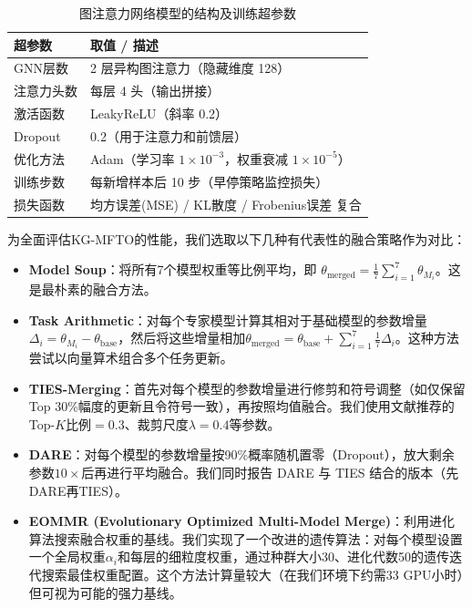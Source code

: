 \documentclass[../main.tex]{subfiles}
\begin{document}
\begin{table}[tb]
	\centering\small
	\caption{图注意力网络模型的结构及训练超参数}
	\label{tab:gat-hyperparams}
	\small\begin{tabular}{ll}
		\toprule
		\textbf{超参数} & \textbf{取值 / 描述}                                 \\
		\midrule
		GNN层数        & 2 层异构图注意力（隐藏维度 128）                              \\
		注意力头数        & 每层 4 头（输出拼接）                                     \\
		激活函数         & LeakyReLU（斜率 0.2）                                \\
		Dropout      & 0.2（用于注意力和前馈层）                                   \\
		优化方法         & Adam（学习率 $1\times10^{-3}$，权重衰减 $1\times10^{-5}$） \\
		训练步数         & 每新增样本后 10 步（早停策略监控损失）                            \\
		损失函数         & 均方误差(MSE) / KL散度 / Frobenius误差 复合                \\
		\bottomrule
	\end{tabular}
\end{table}


为全面评估KG-MFTO的性能，我们选取以下几种有代表性的融合策略作为对比：

\begin{itemize}[leftmargin=3\ccwd]
	\item \textbf{Model Soup}：将所有7个模型权重等比例平均，即 $\theta_{\text{merged}} = \frac{1}{7}\sum_{i=1}^{7}\theta_{M_i}$。这是最朴素的融合方法。
	\item \textbf{Task Arithmetic}：对每个专家模型计算其相对于基础模型的参数增量$\Delta_i=\theta_{M_i}-\theta_{\text{base}}$，然后将这些增量相加$\theta_{\text{merged}}=\theta_{\text{base}} + \sum_{i=1}^7 \frac{1}{7}\Delta_i$。这种方法尝试以向量算术组合多个任务更新。
	\item \textbf{TIES-Merging}：首先对每个模型的参数增量进行修剪和符号调整（如仅保留Top 30\%幅度的更新且令符号一致），再按照均值融合。我们使用文献推荐的Top-$K$比例$=0.3$、裁剪尺度$\lambda=0.4$等参数。
	\item \textbf{DARE}：对每个模型的参数增量按90\%概率随机置零（Dropout），放大剩余参数$10\times$后再进行平均融合。我们同时报告 DARE 与 TIES 结合的版本（先DARE再TIES）。
	\item \textbf{EOMMR (Evolutionary Optimized Multi-Model Merge)}：利用进化算法搜索融合权重的基线。我们实现了一个改进的遗传算法：对每个模型设置一个全局权重$\alpha_i$和每层的细粒度权重，通过种群大小30、进化代数50的遗传迭代搜索最佳权重配置。这个方法计算量较大（在我们环境下约需33 GPU小时）但可视为可能的强力基线。
\end{itemize}
\end{document}
